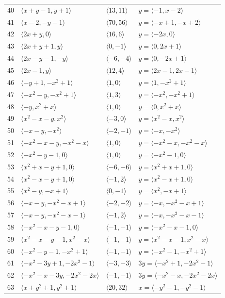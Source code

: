 \documentclass[11pt]{article}
\begin{document}
\begin{longtable}{@{}rlll@{}}
40 & $\langle x+y-1,y+1\rangle$ & $\langle 13,11\rangle$ & $y=\langle -1,x-2\rangle$\\
41 & $\langle x-2,-y-1\rangle$ & $\langle 70,56\rangle$ & $y=\langle -x+1,-x+2\rangle$\\
42 & $\langle 2x+y,0\rangle$ & $\langle 16,6\rangle$ & $y=\langle -2x,0\rangle$\\
43 & $\langle 2x+y+1,y\rangle$ & $\langle 0,-1\rangle$ & $y=\langle 0,2x+1\rangle$\\
44 & $\langle 2x-y-1,-y\rangle$ & $\langle -6,-4\rangle$ & $y=\langle 0,-2x+1\rangle$\\
45 & $\langle 2x-1,y\rangle$ & $\langle 12,4\rangle$ & $y=\langle 2x-1,2x-1\rangle$\\
46 & $\langle -y+1,-x^{2}+1\rangle$ & $\langle 1,0\rangle$ & $y=\langle 1,-x^{2}+1\rangle$\\
47 & $\langle -x^{2}-y,-x^{2}+1\rangle$ & $\langle 1,3\rangle$ & $y=\langle -x^{2},-x^{2}+1\rangle$\\
48 & $\langle -y,x^{2}+x\rangle$ & $\langle 1,0\rangle$ & $y=\langle 0,x^{2}+x\rangle$\\
49 & $\langle x^{2}-x-y,x^{2}\rangle$ & $\langle -3,0\rangle$ & $y=\langle x^{2}-x,x^{2}\rangle$\\
50 & $\langle -x-y,-x^{2}\rangle$ & $\langle -2,-1\rangle$ & $y=\langle -x,-x^{2}\rangle$\\
51 & $\langle -x^{2}-x-y,-x^{2}-x\rangle$ & $\langle 1,0\rangle$ & $y=\langle -x^{2}-x,-x^{2}-x\rangle$\\
52 & $\langle -x^{2}-y-1,0\rangle$ & $\langle 1,0\rangle$ & $y=\langle -x^{2}-1,0\rangle$\\
53 & $\langle x^{2}+x-y+1,0\rangle$ & $\langle -6,-6\rangle$ & $y=\langle x^{2}+x+1,0\rangle$\\
54 & $\langle x^{2}-x-y+1,0\rangle$ & $\langle -1,2\rangle$ & $y=\langle x^{2}-x+1,0\rangle$\\
55 & $\langle x^{2}-y,-x+1\rangle$ & $\langle 0,-1\rangle$ & $y=\langle x^{2},-x+1\rangle$\\
56 & $\langle -x-y,-x^{2}-x+1\rangle$ & $\langle -2,-2\rangle$ & $y=\langle -x,-x^{2}-x+1\rangle$\\
57 & $\langle -x-y,-x^{2}-x-1\rangle$ & $\langle -1,2\rangle$ & $y=\langle -x,-x^{2}-x-1\rangle$\\
58 & $\langle -x^{2}-x-y-1,0\rangle$ & $\langle -1,-1\rangle$ & $y=\langle -x^{2}-x-1,0\rangle$\\
59 & $\langle x^{2}-x-y-1,x^{2}-x\rangle$ & $\langle -1,-1\rangle$ & $y=\langle x^{2}-x-1,x^{2}-x\rangle$\\
60 & $\langle -x^{2}-y-1,-x^{2}+1\rangle$ & $\langle -1,-1\rangle$ & $y=\langle -x^{2}-1,-x^{2}+1\rangle$\\
61 & $\langle -x^{2}-3y+1,-2x^{2}-1\rangle$ & $\langle -3,-3\rangle$ & $3y=\langle -x^{2}+1,-2x^{2}-1\rangle$\\
62 & $\langle -x^{2}-x-3y,-2x^{2}-2x\rangle$ & $\langle -1,-1\rangle$ & $3y=\langle -x^{2}-x,-2x^{2}-2x\rangle$\\
63 & $\langle x+y^{2}+1,y^{2}+1\rangle$ & $\langle 20,32\rangle$ & $x=\langle -y^{2}-1,-y^{2}-1\rangle$\\
\end{longtable}
\end{document}
